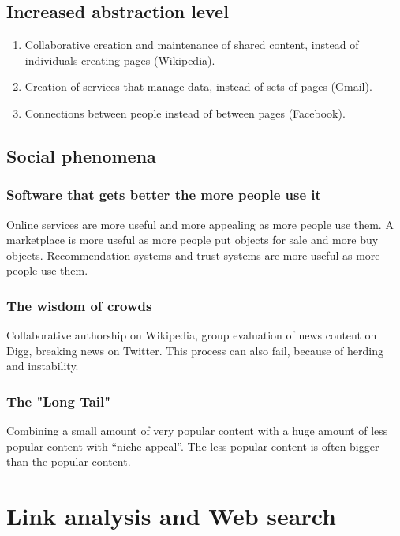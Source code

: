 \subsection{Increased abstraction level}

\begin{enumerate}
\item Collaborative creation and maintenance of shared content, instead of individuals creating pages (Wikipedia).
\item Creation of services that manage data, instead of sets of pages (Gmail).
\item Connections between people instead of between pages (Facebook).
\end{enumerate}

\subsection{Social phenomena}

\subsubsection{Software that gets better the more people use it}

Online services are more useful and more appealing as more people use them. A marketplace is more useful as more people put objects for sale and more buy objects. Recommendation systems and trust systems are more useful as more people use them.

\subsubsection{The wisdom of crowds}

Collaborative authorship on Wikipedia, group evaluation of news content on Digg, breaking news on Twitter. This process can also fail, because of herding and instability.

\subsubsection{The "Long Tail"}

Combining a small amount of very popular content with a huge amount of less popular content with “niche appeal”. The less popular content is often bigger than the popular content.

\section{Link analysis and Web search}


